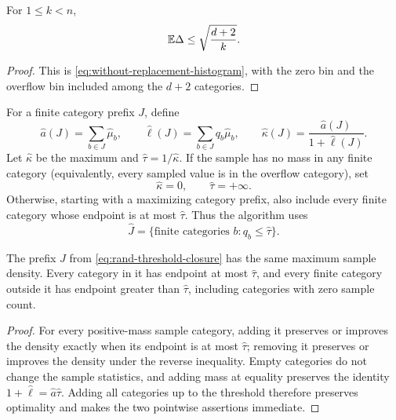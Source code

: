 \begin{lemma}
\label{lem:rand-histogram}
For $1\le k<n$,
\[
 \mathbb{E}\Delta\le\sqrt{\frac{d+2}{k}}.
\]
\end{lemma}

\begin{proof}
This is \cref{eq:without-replacement-histogram}, with the zero bin and the
overflow bin included among the $d+2$ categories.
\end{proof}

For a finite category prefix $J$, define
\[
 \widehat a(J)=\sum_{b\in J}\widehat\mu_b,\qquad
 \widehat\ell(J)=\sum_{b\in J}q_b\widehat\mu_b,\qquad
 \widehat\kappa(J)=\frac{\widehat a(J)}{1+\widehat\ell(J)}.
\]
Let $\widehat\kappa$ be the maximum and
$\widehat\tau=1/\widehat\kappa$.  If the sample has no mass in any finite
category (equivalently, every sampled value is in the overflow category), set
\begin{equation}
 \widehat\kappa=0,
 \qquad \widehat\tau=+\infty.
 \label{eq:rand-empty-finite-sample}
\end{equation}
Otherwise, starting with a maximizing category prefix, also include every
finite category whose endpoint is at most $\widehat\tau$.  Thus the
algorithm uses
\begin{equation}
 \widehat J=\{\text{finite categories }b:q_b\le\widehat\tau\}.
 \label{eq:rand-threshold-closure}
\end{equation}

\begin{lemma}
\label{lem:rand-threshold-closure}
The prefix $\widehat J$ from \cref{eq:rand-threshold-closure} has the same
maximum sample density.  Every category in it has endpoint at most
$\widehat\tau$, and
every finite category outside it has endpoint greater than
$\widehat\tau$, including categories with zero sample count.
\end{lemma}

\begin{proof}
For every positive-mass sample category, adding it preserves or improves the
density exactly when its endpoint is at most $\widehat\tau$; removing it
preserves or improves the density under the reverse inequality.  Empty
categories do not change the sample statistics, and adding mass at equality
preserves the identity
$1+\widehat\ell=\widehat a\widehat\tau$.  Adding all categories up to the
threshold therefore preserves optimality and makes the two pointwise
assertions immediate.
\end{proof}

